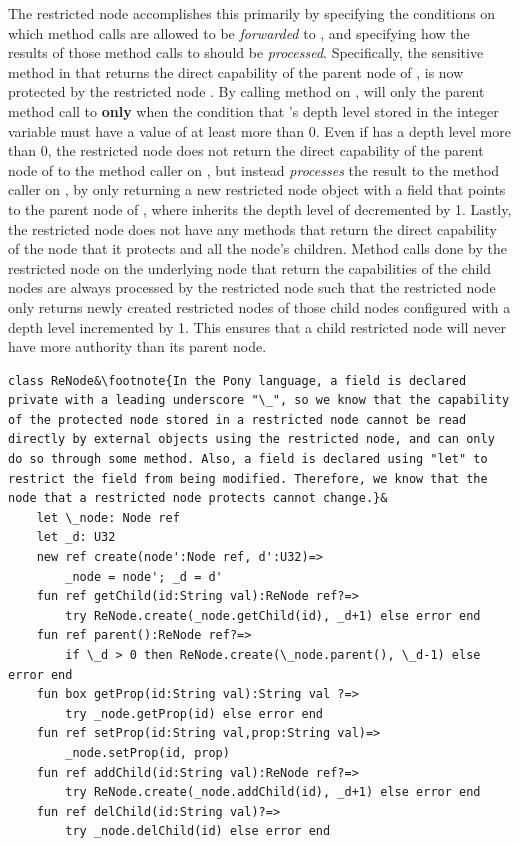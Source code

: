 \documentclass[a4paper,11pt,twoside]{article}
\begin{document}
The restricted node accomplishes this primarily by specifying the conditions on which method calls are allowed to be \textit{forwarded} to , and specifying how the results of those method calls to  should be \textit{processed}. Specifically, the sensitive  method in  that returns the direct capability of the parent node of , is now protected by the restricted node . By calling  method on ,  will only  the parent method call to  \textbf{only} when the condition that 's depth level stored in the integer variable  must have a value of at least more than 0. Even if  has a depth level more than 0, the restricted node does not return the direct capability of the parent node of  to the method caller on , but instead \textit{processes} the result to the method caller on , by only returning a new restricted node object  with a field that points to the parent node of , where  inherits the depth level of  decremented by 1. Lastly, the restricted node does not have any methods that return the direct capability of the node that it protects and all the node's children. Method calls done by the restricted node on the underlying node that return the capabilities of the child nodes are always processed by the restricted node such that the restricted node only returns newly created restricted nodes of those child nodes configured with a depth level incremented by 1. This ensures that a child restricted node will never have more authority than its parent node.

\begin{lstlisting}
class ReNode&\footnote{In the Pony language, a field is declared private with a leading underscore "\_", so we know that the capability of the protected node stored in a restricted node cannot be read directly by external objects using the restricted node, and can only do so through some method. Also, a field is declared using "let" to restrict the field from being modified. Therefore, we know that the node that a restricted node protects cannot change.}&
    let \_node: Node ref
    let _d: U32
    new ref create(node':Node ref, d':U32)=>
        _node = node'; _d = d'
    fun ref getChild(id:String val):ReNode ref?=>
        try ReNode.create(_node.getChild(id), _d+1) else error end
    fun ref parent():ReNode ref?=>
        if \_d > 0 then ReNode.create(\_node.parent(), \_d-1) else error end
    fun box getProp(id:String val):String val ?=>
        try _node.getProp(id) else error end
    fun ref setProp(id:String val,prop:String val)=>
        _node.setProp(id, prop)
    fun ref addChild(id:String val):ReNode ref?=>
        try ReNode.create(_node.addChild(id), _d+1) else error end
    fun ref delChild(id:String val)?=>
        try _node.delChild(id) else error end
\end{lstlisting}
\end{document}
